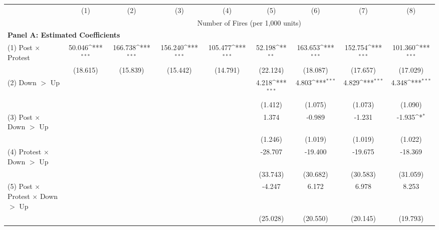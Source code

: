 {
\def\sym#1{\ifmmode^{#1}\else\(^{#1}\)\fi}
\begin{tabular}{l*{8}{c}}
\hline
& (1) & (2) & (3) & (4) & (5) & (6) & (7) & (8) \\
            & \multicolumn{8}{c}{Number of Fires (per 1,000 units)} \\
             \hline
\multicolumn{9}{l}{\textbf{Panel A: Estimated Coefficients}} \\ \hline
(1) Post $\times$ Protest&      50.046\sym{***}&     166.738\sym{***}&     156.240\sym{***}&     105.477\sym{***}&      52.198\sym{**} &     163.653\sym{***}&     152.754\sym{***}&     101.360\sym{***}\\
            &    (18.615)         &    (15.839)         &    (15.442)         &    (14.791)         &    (22.124)         &    (18.087)         &    (17.657)         &    (17.029)         \\
(2) Down $>$ Up&                     &                     &                     &                     &       4.218\sym{***}&       4.803\sym{***}&       4.829\sym{***}&       4.348\sym{***}\\
            &                     &                     &                     &                     &     (1.412)         &     (1.075)         &     (1.073)         &     (1.090)         \\
(3) Post $\times$ Down $>$ Up&                     &                     &                     &                     &       1.374         &      -0.989         &      -1.231         &      -1.935\sym{*}  \\
            &                     &                     &                     &                     &     (1.246)         &     (1.019)         &     (1.019)         &     (1.022)         \\
(4) Protest $\times$ Down $>$ Up&                     &                     &                     &                     &     -28.707         &     -19.400         &     -19.675         &     -18.369         \\
            &                     &                     &                     &                     &    (33.743)         &    (30.682)         &    (30.583)         &    (31.059)         \\
(5) Post $\times$ Protest $\times$ Down $>$ Up&                     &                     &                     &                     &      -4.247         &       6.172         &       6.978         &       8.253         \\
            &                     &                     &                     &                     &    (25.028)         &    (20.550)         &    (20.145)         &    (19.793)         \\





\end{tabular}}
